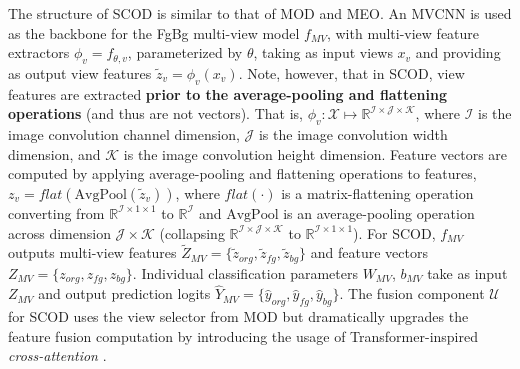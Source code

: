 The structure of SCOD is similar to that of MOD and MEO. An MVCNN is used as the backbone for the FgBg multi-view model $f_{MV}$, with multi-view feature extractors $\phi_v = f_{\theta,v}$, parameterized by $\theta$, taking as input views $x_v$ and providing as output view features $\tilde{z}_v = \phi_v (x_v)$. Note, however, that in SCOD, view features are extracted \textbf{prior to the average-pooling and flattening operations} (and thus are not vectors). That is, $\phi_v: \mathcal{X} \mapsto \mathbb{R}^{\mathcal{I} \times \mathcal{J} \times \mathcal{K}}$, where $\mathcal{I}$ is the image convolution channel dimension, $\mathcal{J}$ is the image convolution width dimension, and $\mathcal{K}$ is the image convolution height dimension. Feature vectors are computed by applying average-pooling and flattening operations to features, $z_v = flat(\text{AvgPool}(\tilde{z}_v))$, where $flat(\cdot)$ is a matrix-flattening operation converting from $\mathbb{R}^{\mathcal{I} \times 1 \times 1}$ to $\mathbb{R}^{\mathcal{I}}$ and $\text{AvgPool}$ is an average-pooling operation across dimension $\mathcal{J} \times \mathcal{K}$ (collapsing $\mathbb{R}^{\mathcal{I} \times \mathcal{J} \times \mathcal{K}}$ to $\mathbb{R}^{\mathcal{I} \times 1 \times 1}$). For SCOD, $f_{MV}$ outputs multi-view features $\tilde{Z}_{MV} = \{\tilde{z}_{org}, \tilde{z}_{fg}, \tilde{z}_{bg}\}$ and feature vectors $Z_{MV} = \{z_{org}, z_{fg}, z_{bg}\}$. Individual classification parameters $W_{MV}$, $b_{MV}$ take as input $Z_{MV}$ and output prediction logits $\hat{Y}_{MV} = \{\hat{y}_{org}, \hat{y}_{fg}, \hat{y}_{bg}\}$. The fusion component $\mathcal{U}$ for SCOD uses the view selector from MOD but dramatically upgrades the feature fusion computation by introducing the usage of Transformer-inspired \emph{cross-attention} \cite{vaswani2017attention}.

